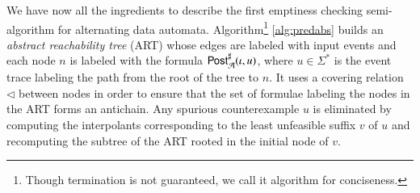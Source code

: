 \documentclass[10pt,conference,letterpaper,twocolumn]{IEEEtran}
\begin{document}
We have now all the ingredients to describe the first emptiness
checking semi-algorithm for alternating data
automata. Algorithm\footnote{Though termination is not guaranteed,
  we call it algorithm for conciseness.}  \ref{alg:predabs} builds
an \emph{abstract reachability tree} (ART) whose edges are labeled
with input events and each node $n$ is labeled with the formula
${\mathsf{Post}}^\sharp_{\mathcal{A}}(\iota,u)$, where $u \in \Sigma^*$ is the event trace
labeling the path from the root of the tree to $n$. It uses a covering
relation $\lhd$ between nodes in order to ensure that the set of
formulae labeling the nodes in the ART forms an antichain. Any
spurious counterexample $u$ is eliminated by computing the
interpolants corresponding to the least unfeasible suffix $v$ of $u$
and recomputing the subtree of the ART rooted in the initial node of
$v$.
\end{document}
